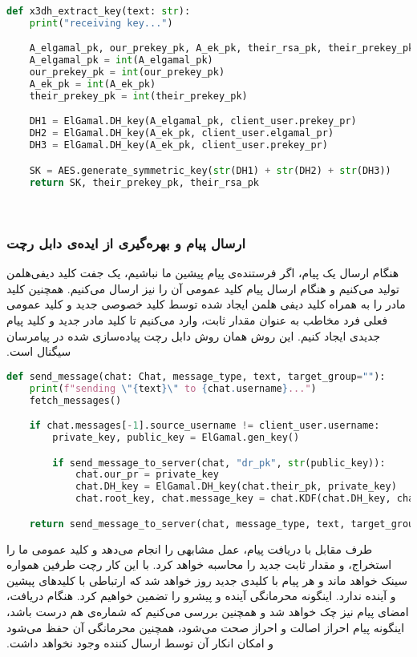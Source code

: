 \begin{latin}
\begin{lstlisting}[firstnumber=310, language=Python]
def x3dh_extract_key(text: str):
    print("receiving key...")

    A_elgamal_pk, our_prekey_pk, A_ek_pk, their_rsa_pk, their_prekey_pk = text.split(Resources.SEP)
    A_elgamal_pk = int(A_elgamal_pk)
    our_prekey_pk = int(our_prekey_pk)
    A_ek_pk = int(A_ek_pk)
    their_prekey_pk = int(their_prekey_pk)

    DH1 = ElGamal.DH_key(A_elgamal_pk, client_user.prekey_pr)
    DH2 = ElGamal.DH_key(A_ek_pk, client_user.elgamal_pr)
    DH3 = ElGamal.DH_key(A_ek_pk, client_user.prekey_pr)

    SK = AES.generate_symmetric_key(str(DH1) + str(DH2) + str(DH3))
    return SK, their_prekey_pk, their_rsa_pk
\end{lstlisting}
\end{latin}
‫
‫\subsubsection{ارسال پیام و بهره‌گیری از ایده‌ی دابل رچت}
‫هنگام ارسال یک پیام، اگر فرستنده‌ی پیام پیشین ما نباشیم، یک جفت کلید دیفی‌هلمن تولید می‌کنیم و هنگام ارسال پیام کلید عمومی آن را نیز ارسال می‌کنیم. همچنین کلید مادر را به همراه کلید دیفی هلمن ایجاد شده توسط کلید خصوصی جدید و کلید عمومی فعلی فرد مخاطب به عنوان مقدار ثابت، وارد  می‌کنیم تا کلید مادر جدید و کلید پیام جدیدی ایجاد کنیم. این روش همان روش دابل رچت پیاده‌سازی شده در پیامرسان سیگنال است.

\begin{latin}
\begin{lstlisting}[firstnumber=346, language=Python]
def send_message(chat: Chat, message_type, text, target_group=""):
    print(f"sending \"{text}\" to {chat.username}...")
    fetch_messages()

    if chat.messages[-1].source_username != client_user.username:
        private_key, public_key = ElGamal.gen_key()

        if send_message_to_server(chat, "dr_pk", str(public_key)):
            chat.our_pr = private_key
            chat.DH_key = ElGamal.DH_key(chat.their_pk, private_key)
            chat.root_key, chat.message_key = chat.KDF(chat.DH_key, chat.root_key)

    return send_message_to_server(chat, message_type, text, target_group)
\end{lstlisting}
\end{latin}
‫
‫طرف مقابل با دریافت پیام، عمل مشابهی را انجام می‌دهد و کلید عمومی ما را استخراج، و مقدار ثابت جدید را محاسبه خواهد کرد. با این کار رچت طرفین همواره سینک خواهد ماند و هر پیام با کلیدی جدید روز خواهد شد که ارتباطی با کلیدهای پیشین و آینده ندارد. اینگونه محرمانگی آینده و پیشرو را تضمین خواهیم کرد. هنگام دریافت، امضای پیام نیز چک خواهد شد و همچنین بررسی می‌کنیم که شماره‌ی  هم درست باشد، اینگونه پیام احراز اصالت و احراز صحت می‌شود، همچنین محرمانگی آن حفظ می‌شود و امکان انکار آن توسط ارسال کننده وجود نخواهد داشت.
‫

